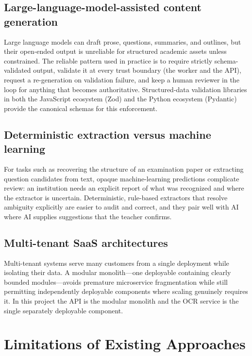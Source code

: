\subsection{Large-language-model-assisted content generation}

Large language models can draft prose, questions, summaries, and
outlines, but their open-ended output is unreliable for structured academic
assets unless constrained. The reliable pattern used in practice is to
require strictly schema-validated output, validate it at every trust boundary
(the worker and the API), request a re-generation on validation failure, and
keep a human reviewer in the loop for anything that becomes authoritative.
Structured-data validation libraries in both the JavaScript ecosystem (Zod)
and the Python ecosystem (Pydantic) \cite{pydantic} provide the canonical
schemas for this enforcement.

\subsection{Deterministic extraction versus machine learning}

For tasks such as recovering the structure of an examination paper or
extracting question candidates from text, opaque machine-learning predictions
complicate review: an institution needs an explicit report of what was
recognized and where the extractor is uncertain. Deterministic, rule-based
extractors that resolve ambiguity explicitly are easier to audit and correct,
and they pair well with AI where AI supplies suggestions that the teacher
confirms.

\subsection{Multi-tenant SaaS architectures}

Multi-tenant systems serve many customers from a single deployment while
isolating their data. A modular monolith---one deployable containing clearly
bounded modules---avoids premature microservice fragmentation while still
permitting independently deployable components where scaling genuinely
requires it. In this project the API is the modular monolith and the OCR
service is the single separately deployable component.

\section{Limitations of Existing Approaches}

